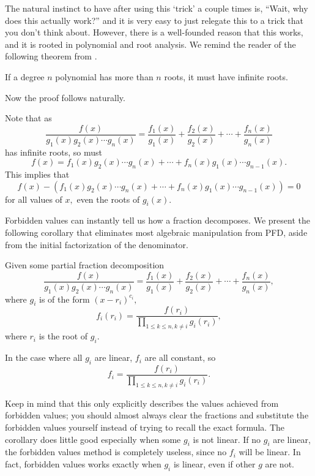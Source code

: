 \documentclass{article}
\begin{document}
The natural instinct to have after using this `trick' a couple times is, ``Wait, why does this actually work?'' and it is very easy to just relegate this to a trick that you don't think about. However, there is a well-founded reason that this works, and it is rooted in polynomial and root analysis. We remind the reader of the following theorem from .

\begin{theo}
If a degree $n$ polynomial has more than $n$ roots, it must have infinite roots.
\end{theo}

Now the proof follows naturally.

\begin{pro}
Note that as
\[\frac{f(x)}{g_1(x)g_2(x)\cdots g_n(x)}=\frac{f_1(x)}{g_1(x)}+\frac{f_2(x)}{g_2(x)}+\cdots+\frac{f_n(x)}{g_n(x)}\]
has infinite roots, so must 
\[f(x)=f_1(x)g_2(x)\cdots g_n(x)+\cdots+f_n(x)g_1(x)\cdots g_{n-1}(x).\]
This implies that
\[f(x)-(f_1(x)g_2(x)\cdots g_n(x)+\cdots+f_n(x)g_1(x)\cdots g_{n-1}(x))=0\]
for all values of $x,$ even the roots of $g_i(x).$
\end{pro}

Forbidden values can instantly tell us how a fraction decomposes. We present the following corollary that eliminates most algebraic manipulation from PFD, aside from the initial factorization of the denominator.

\begin{theo}
Given some partial fraction decomposition
\[\frac{f(x)}{g_1(x)g_2(x)\cdots g_n(x)}=\frac{f_1(x)}{g_1(x)}+\frac{f_2(x)}{g_2(x)}+\cdots+\frac{f_n(x)}{g_n(x)},\] where $g_i$ is of the form $(x-r_i)^{c_i},$
\[f_i(r_i)=\frac{f(r_i)}{\prod\limits_{1\leq k\leq n, k\neq i}g_i(r_i)},\] where $r_i$ is the root of $g_i.$

In the case where all $g_i$ are linear, $f_i$ are all constant, so \[f_i=\frac{f(r_i)}{\prod\limits_{1\leq k\leq n,k\neq i}g_i(r_i)}.\]
\end{theo}

Keep in mind that this only explicitly describes the values achieved from forbidden values; you should almost always clear the fractions and substitute the forbidden values yourself instead of trying to recall the exact formula. The corollary does little good especially when some $g_i$ is not linear. If no $g_i$ are linear, the forbidden values method is completely useless, since no $f_i$ will be linear. In fact, forbidden values works exactly when $g_i$ is linear, even if other $g$ are not.
\end{document}
